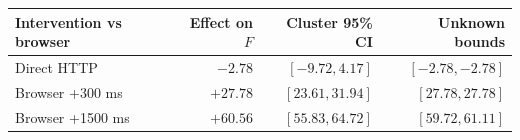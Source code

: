 \begin{tabular}{@{}lrrr@{}}\toprule
Intervention vs browser & Effect on $F$ & Cluster 95\% CI & Unknown bounds\\\midrule
Direct HTTP & $-2.78$ & $[-9.72,4.17]$ & $[-2.78,-2.78]$\\
Browser +300 ms & $+27.78$ & $[23.61,31.94]$ & $[27.78,27.78]$\\
Browser +1500 ms & $+60.56$ & $[55.83,64.72]$ & $[59.72,61.11]$\\
\bottomrule
\end{tabular}
